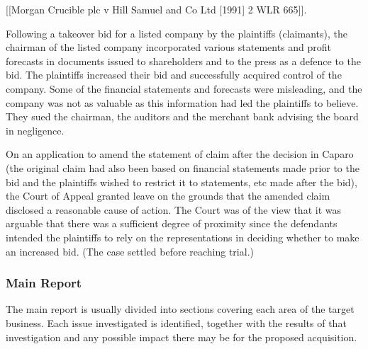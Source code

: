 \documentclass[
]{article}
\begin{document}
{[}{[}Morgan Crucible plc v Hill Samuel and Co Ltd {[}1991{]} 2 WLR
665{]}{]}.

Following a takeover bid for a listed company by the plaintiffs
(claimants), the chairman of the listed company incorporated various
statements and profit forecasts in documents issued to shareholders and
to the press as a defence to the bid. The plaintiffs increased their bid
and successfully acquired control of the company. Some of the financial
statements and forecasts were misleading, and the company was not as
valuable as this information had led the plaintiffs to believe. They
sued the chairman, the auditors and the merchant bank advising the board
in negligence.

On an application to amend the statement of claim after the decision in
Caparo (the original claim had also been based on financial statements
made prior to the bid and the plaintiffs wished to restrict it to
statements, etc made after the bid), the Court of Appeal granted leave
on the grounds that the amended claim disclosed a reasonable cause of
action. The Court was of the view that it was arguable that there was a
sufficient degree of proximity since the defendants intended the
plaintiffs to rely on the representations in deciding whether to make an
increased bid. (The case settled before reaching trial.)

\hypertarget{main-report}{%
\subsubsection{Main Report}\label{main-report}}

The main report is usually divided into sections covering each area of
the target business. Each issue investigated is identified, together
with the results of that investigation and any possible impact there may
be for the proposed acquisition.
\end{document}
